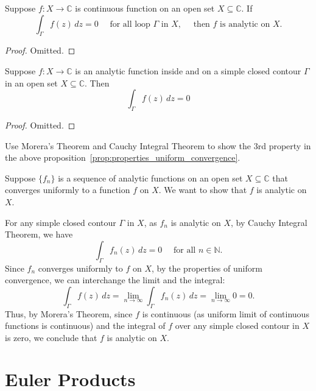 \documentclass{elegantbook}
\begin{document}
\begin{theorem} \label{thm:morera_theorem}
  Suppose $f:X\to\mathbb{C}$ is continuous function on an open set $X \subseteq \mathbb{C}$. If
  \[
    \int_{\Gamma} f(z) \, dz = 0 \quad \text{ for all loop } \Gamma \text{ in } X, \quad \text{ then } f \text{ is analytic on } X.
  \]
\end{theorem}

\begin{proof}
  Omitted.
\end{proof}

\begin{theorem} \label{thm:cauchy_integral_theorem}
  Suppose $f:X\to\mathbb{C}$ is an analytic function inside and on a simple closed contour $\Gamma$ in an open set $X \subseteq \mathbb{C}$. Then
  \[
    \int_{\Gamma} f(z) \, dz = 0
  \]
\end{theorem}

\begin{proof}
  Omitted.
\end{proof}

\begin{exercise}
  Use Morera's Theorem and Cauchy Integral Theorem to show the 3rd property in the above proposition~\ref{prop:properties_uniform_convergence}.
\end{exercise}

\begin{solution}
  Suppose $\{f_n\}$ is a sequence of analytic functions on an open set $X \subseteq \mathbb{C}$ that converges uniformly to a function $f$ on $X$. We want to show that $f$ is analytic on $X$.

  For any simple closed contour $\Gamma$ in $X$, as $f_n$ is analytic on $X$, by Cauchy Integral Theorem, we have
  \[
    \int_{\Gamma} f_n(z) \, dz = 0 \quad \text{ for all } n \in \mathbb{N}.
  \]
  Since $f_n$ converges uniformly to $f$ on $X$, by the properties of uniform convergence, we can interchange the limit and the integral:
  \[
    \int_{\Gamma} f(z) \, dz = \lim_{n \to \infty} \int_{\Gamma} f_n(z) \, dz = \lim_{n \to \infty} 0 = 0.
  \]
  Thus, by Morera's Theorem, since $f$ is continuous (as uniform limit of continuous functions is continuous) and the integral of $f$ over any simple closed contour in $X$ is zero, we conclude that $f$ is analytic on $X$.
\end{solution}


\section{Euler Products}
\end{document}
